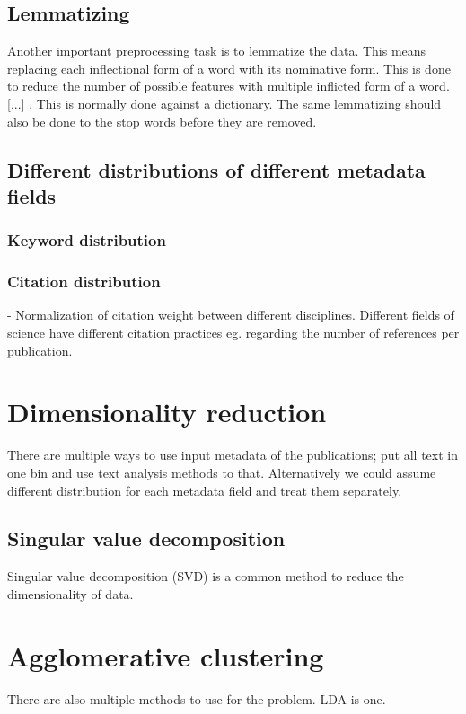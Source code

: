 \subsection{Lemmatizing}
Another important preprocessing task is to lemmatize the data. 
This means replacing each inflectional form of a word with its 
nominative form. This is done to reduce the number of possible 
features with multiple inflicted form of a word. [...] 
\cite{ref_here}. This is normally done against a dictionary. The 
same lemmatizing should also be done to the stop words before they 
are removed.


\subsection{Different distributions of different metadata fields}
\subsubsection{Keyword distribution}
\subsubsection{Citation distribution}
- Normalization of citation weight between different disciplines.
  Different fields of science have different citation practices 
eg. regarding the number of references per publication. 
\cite{waltman_new_2012}


\section{Dimensionality reduction}
\label{sec:dimensionalityreduction}
There are multiple ways to use input metadata of the publications; 
put all text in one bin and use text analysis methods to that. 
Alternatively we could assume different distribution for each 
metadata field  and treat them
separately.
\subsection{Singular value decomposition}
Singular value decomposition (SVD) is a common method to reduce 
the dimensionality of data. 

\section{Agglomerative clustering}
\label{sec:agglomerativeclustering}
There are also multiple methods to use for the problem. LDA is one.

